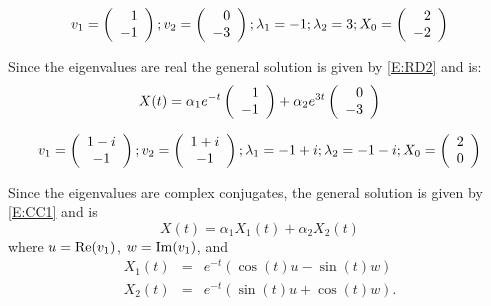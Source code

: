 \documentclass{ximera}
\begin{document}
\begin{exercise} \label{A6.4.2}
\[
v_1 = \left(\begin{array}{rrrrrrrrrrrrrrrrrr}  1 \\ -1 \end{array}\right); v_2 = \left(\begin{array}{rrrrrrrrrrrrrrrrrr}  0 \\ -3  \end{array}\right); \lambda_1 = -1; \lambda_2 = 3; X_0 = \left(\begin{array}{rrrrrrrrrrrrrrrrrr} 2 \\ -2  \end{array}\right)
\]

\begin{solution}
\soln Since the eigenvalues are real the general solution is given by \eqref{E:RD2} and is:
\[
X(t) = \alpha_1 e^{-t} \left(\begin{array}{rrrrrrrrrrrrrrrrrr}  1 \\ -1 \end{array}\right) + \alpha_2 e^{3t}\left(\begin{array}{rrrrrrrrrrrrrrrrrr}  0 \\ -3  \end{array}\right)
\]

\begin{figure}[htb]
           \centerline{%
           }
\end{figure}
\end{solution}
\end{exercise}

\begin{exercise} \label{A6.4.3}
\[
v_1 = \left(\begin{array}{cccccccccccc}  1 -i \\ -1 \end{array}\right); v_2 = \left(\begin{array}{cccccccccccc}  1 + i \\ -1  \end{array}\right); \lambda_1 = -1+i;  \lambda_2 = -1-i; X_0 = \left(\begin{array}{rrrrrrrrrrrrrrrrrr} 2 \\ 0 \end{array}\right)
\]

\begin{solution}
\soln Since the eigenvalues are complex conjugates, the general solution is given by \eqref{E:CC1} and is
\[
X(t) = \alpha_1 X_1(t) + \alpha_2 X_2(t)
\]
where $u={\rm Re}(v_1)$, $w={\rm Im}(v_1)$, and 
\[
\begin{array}{rcl}
X_1(t) & = & e^{-t}(\cos(t)u -\sin(t)w)\\
X_2(t) & = & e^{-t}(\sin(t)u +\cos(t)w).
\end{array}
\]
\begin{figure}[htb]
           \centerline{%
           }
\end{figure}
\end{solution}
\end{exercise}
\end{document}
